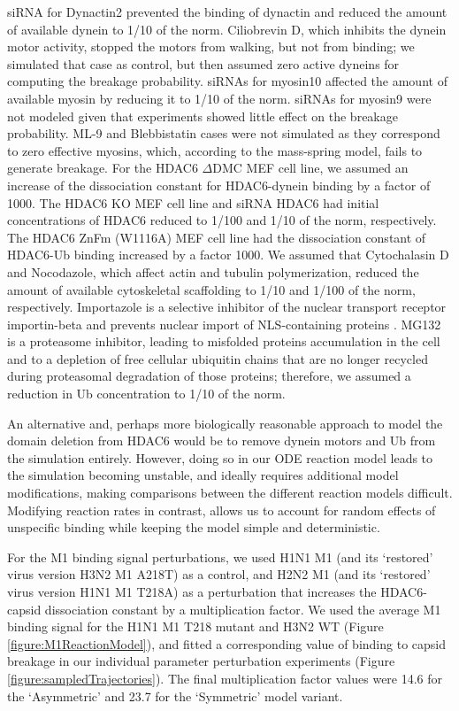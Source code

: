 siRNA for Dynactin2 prevented the binding of dynactin and reduced the amount of available dynein to 1/10 of the norm. Ciliobrevin D, which inhibits the dynein motor activity, stopped the motors from walking, but not from binding; we simulated that case as control, but then assumed zero active dyneins for computing the breakage probability. siRNAs for myosin10 affected the amount of available myosin by reducing it to 1/10 of the norm. siRNAs for myosin9 were not modeled given that experiments showed little effect on the breakage probability. ML-9 and Blebbistatin cases were not simulated as they correspond to zero effective myosins, which, according to the mass-spring model, fails to generate breakage. For the HDAC6 $\Delta$DMC MEF cell line, we assumed an increase of the dissociation constant for HDAC6-dynein binding by a factor of 1000. The HDAC6 KO MEF cell line and siRNA HDAC6 had initial concentrations of HDAC6 reduced to 1/100 and 1/10 of the norm, respectively. The HDAC6 ZnFm (W1116A) MEF cell line had the dissociation constant of HDAC6-Ub binding increased by a factor 1000. We assumed that Cytochalasin D and Nocodazole, which affect actin and tubulin polymerization, reduced the amount of available cytoskeletal scaffolding to 1/10 and 1/100 of the norm, respectively. Importazole is a selective inhibitor of the nuclear transport receptor importin-beta and prevents nuclear import of NLS-containing proteins \cite{soderholm2011importazole}. MG132 is a proteasome inhibitor, leading to misfolded proteins accumulation in the cell and to a depletion of free cellular ubiquitin chains that are no longer recycled during proteasomal degradation of those proteins; therefore, we assumed a reduction in Ub concentration to 1/10 of the norm.

An alternative and, perhaps more biologically reasonable approach to model the domain deletion from HDAC6 would be to remove dynein motors and Ub from the simulation entirely. However, doing so in our ODE reaction model leads to the simulation becoming unstable, and ideally requires additional model modifications, making comparisons between the different reaction models difficult. Modifying reaction rates in contrast, allows us to account for random effects of unspecific binding while keeping the model simple and deterministic.

For the M1 binding signal perturbations, we used H1N1 M1 (and its ‘restored’ virus version H3N2 M1 A218T) as a control, and H2N2 M1 (and its ‘restored’ virus version H1N1 M1 T218A) as a perturbation that increases the HDAC6-capsid dissociation constant by a multiplication factor. We used the average M1 binding signal for the H1N1 M1 T218 mutant and H3N2 WT (Figure \ref{figure:M1ReactionModel}), and fitted a corresponding value of binding to capsid breakage in our individual parameter perturbation experiments (Figure \ref{figure:sampledTrajectories}). The final multiplication factor values were 14.6 for the ‘Asymmetric’ and 23.7 for the ‘Symmetric’ model variant.

